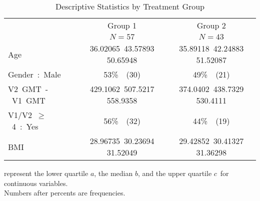 %
\begin{table}[!tbp]
\caption{Descriptive Statistics by Treatment Group\label{sf1}} 
\begin{center}
\begin{tabular}{lcc}
\hline\hline
\multicolumn{1}{l}{}&\multicolumn{1}{c}{Group 1}&\multicolumn{1}{c}{Group 2}\tabularnewline
&\multicolumn{1}{c}{{\scriptsize $N=57$}}&\multicolumn{1}{c}{{\scriptsize $N=43$}}\tabularnewline
\hline
Age&{\scriptsize 36.02065~}{43.57893 }{\scriptsize 50.65948} &{\scriptsize 35.89118~}{42.24883 }{\scriptsize 51.52087} \tabularnewline
Gender~:~Male&53\%~{\scriptsize~(30)}&49\%~{\scriptsize~(21)}\tabularnewline
V2~GMT~-~V1~GMT&{\scriptsize 429.1062~}{507.5217 }{\scriptsize 558.9358} &{\scriptsize 374.0402~}{438.7329 }{\scriptsize 530.4111} \tabularnewline
V1/V2~$\geq$~4~:~Yes&56\%~{\scriptsize~(32)}&44\%~{\scriptsize~(19)}\tabularnewline
BMI&{\scriptsize 28.96735~}{30.23694 }{\scriptsize 31.52049} &{\scriptsize 29.42852~}{30.41327 }{\scriptsize 31.36298} \tabularnewline
\hline
\end{tabular}
\end{center}
 represent the lower quartile $a$, the median $b$, and the upper quartile $c$\ for continuous variables.\\Numbers after percents are frequencies.\end{table}

